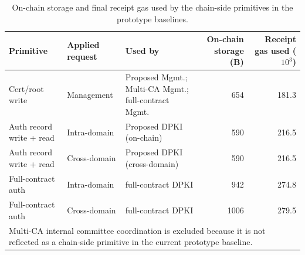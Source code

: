 \begin{table}[t]
\centering
\caption{On-chain storage and final receipt gas used by the chain-side primitives in the prototype baselines.}
\label{tab:onchain-cost-v1}
\scriptsize
\setlength{\tabcolsep}{3.8pt}
\begin{tabular}{lllrr}
\hline
Primitive & Applied request & Used by & On-chain storage (B) & Receipt gas used ($10^3$) \\
\hline
Cert/root write & Management & Proposed Mgmt.; Multi-CA Mgmt.; full-contract Mgmt. & 654 & 181.3 \\
Auth record write + read & Intra-domain & Proposed DPKI (on-chain) & 590 & 216.5 \\
Auth record write + read & Cross-domain & Proposed DPKI (cross-domain) & 590 & 216.5 \\
Full-contract auth & Intra-domain & full-contract DPKI & 942 & 274.8 \\
Full-contract auth & Cross-domain & full-contract DPKI & 1006 & 279.5 \\
\hline
\multicolumn{5}{l}{\footnotesize Multi-CA internal committee coordination is excluded because it is not reflected as a chain-side primitive in the current prototype baseline.}
\end{tabular}
\end{table}
